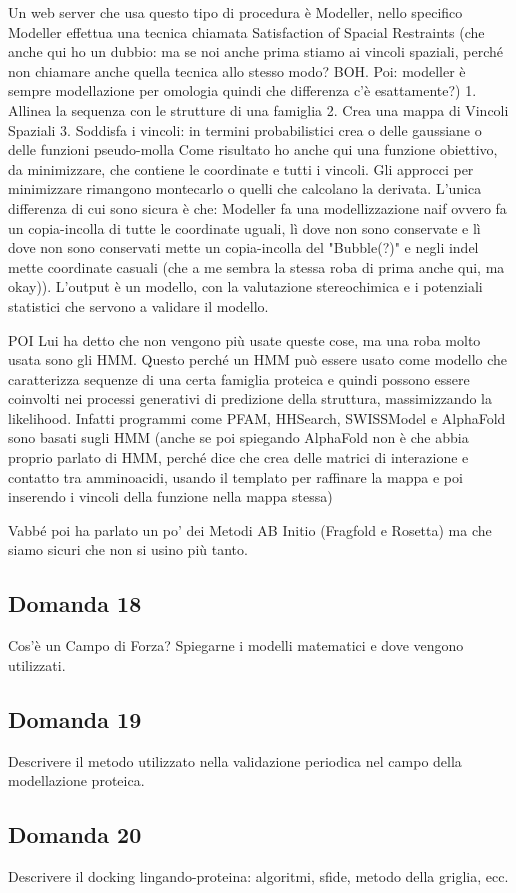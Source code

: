 \documentclass{article}
\begin{document}
Un web server che usa questo tipo di procedura è Modeller, nello specifico Modeller effettua una tecnica chiamata Satisfaction of Spacial Restraints (che anche qui ho un dubbio: ma se noi anche prima stiamo ai vincoli spaziali, perché non chiamare anche quella tecnica allo stesso modo? BOH. Poi: modeller è sempre modellazione per omologia quindi che differenza c'è esattamente?)
1. Allinea la sequenza con le strutture di una famiglia
2. Crea una mappa di Vincoli Spaziali
3. Soddisfa i vincoli: in termini probabilistici crea o delle gaussiane o delle funzioni pseudo-molla
Come risultato ho anche qui una funzione obiettivo, da minimizzare, che contiene le coordinate e tutti i vincoli. Gli approcci per minimizzare rimangono montecarlo o quelli che calcolano la derivata.
L'unica differenza di cui sono sicura è che:
Modeller fa una modellizzazione naif ovvero fa un copia-incolla di tutte le coordinate uguali, lì dove non sono conservate e lì dove non sono conservati mette un copia-incolla del "Bubble(?)" e negli indel mette coordinate casuali (che a me sembra la stessa roba di prima anche qui, ma okay)). L'output è un modello, con la valutazione stereochimica e i potenziali statistici che servono a validare il modello.

POI
Lui ha detto che non vengono più usate queste cose, ma una roba molto usata sono gli HMM. Questo perché un HMM può essere usato come modello che caratterizza sequenze di una certa famiglia proteica e quindi possono essere coinvolti nei processi generativi di predizione della struttura, massimizzando la likelihood. Infatti programmi come PFAM, HHSearch, SWISSModel e AlphaFold sono basati sugli HMM (anche se poi spiegando AlphaFold non è che abbia proprio parlato di HMM, perché dice che crea delle matrici di interazione e contatto tra amminoacidi, usando il templato per raffinare la mappa e poi inserendo i vincoli della funzione nella mappa stessa)

Vabbé poi ha parlato un po' dei Metodi AB Initio (Fragfold e Rosetta) ma che siamo sicuri che non si usino più tanto.

\subsection*{Domanda 18}
Cos'è un Campo di Forza? Spiegarne i modelli matematici e dove vengono utilizzati.

\subsection*{Domanda 19}
Descrivere il metodo utilizzato nella validazione periodica nel campo della modellazione proteica.

\subsection*{Domanda 20}
Descrivere il docking lingando-proteina: algoritmi, sfide, metodo della griglia, ecc.
\end{document}
